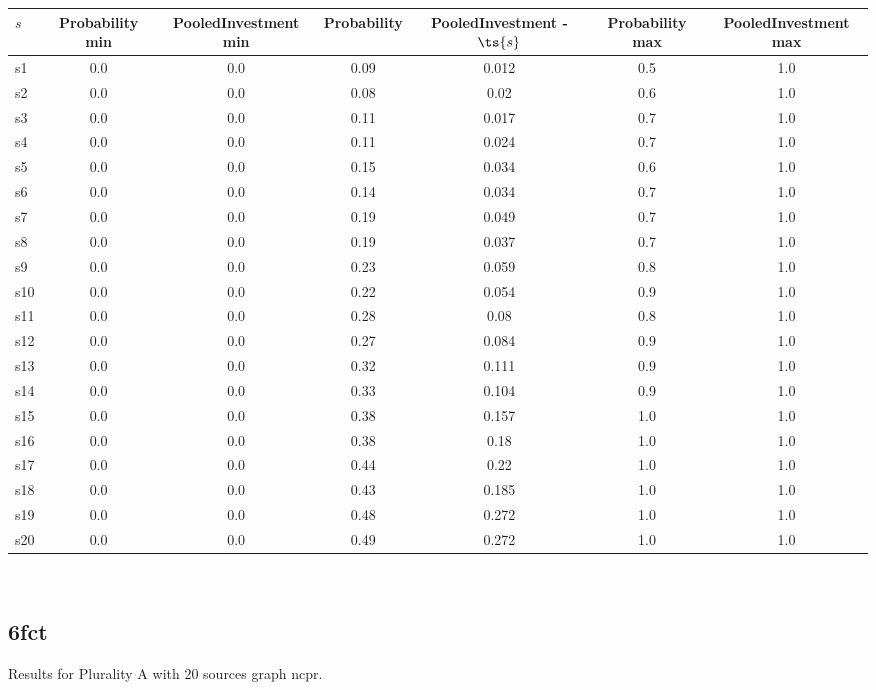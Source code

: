 \documentclass{article}
\begin{document}
\noindent\begin{tabular}{|l|c|c|c|c|c|c|}
\hline
$s$& Probability min & PooledInvestment min & Probability & PooledInvestment - $\ts{s}$ & Probability max & PooledInvestment max\\
\hline
s1 &0.0 & 0.0 & 0.09 & 0.012 & 0.5 & 1.0\\
\hline
s2 &0.0 & 0.0 & 0.08 & 0.02 & 0.6 & 1.0\\
\hline
s3 &0.0 & 0.0 & 0.11 & 0.017 & 0.7 & 1.0\\
\hline
s4 &0.0 & 0.0 & 0.11 & 0.024 & 0.7 & 1.0\\
\hline
s5 &0.0 & 0.0 & 0.15 & 0.034 & 0.6 & 1.0\\
\hline
s6 &0.0 & 0.0 & 0.14 & 0.034 & 0.7 & 1.0\\
\hline
s7 &0.0 & 0.0 & 0.19 & 0.049 & 0.7 & 1.0\\
\hline
s8 &0.0 & 0.0 & 0.19 & 0.037 & 0.7 & 1.0\\
\hline
s9 &0.0 & 0.0 & 0.23 & 0.059 & 0.8 & 1.0\\
\hline
s10 &0.0 & 0.0 & 0.22 & 0.054 & 0.9 & 1.0\\
\hline
s11 &0.0 & 0.0 & 0.28 & 0.08 & 0.8 & 1.0\\
\hline
s12 &0.0 & 0.0 & 0.27 & 0.084 & 0.9 & 1.0\\
\hline
s13 &0.0 & 0.0 & 0.32 & 0.111 & 0.9 & 1.0\\
\hline
s14 &0.0 & 0.0 & 0.33 & 0.104 & 0.9 & 1.0\\
\hline
s15 &0.0 & 0.0 & 0.38 & 0.157 & 1.0 & 1.0\\
\hline
s16 &0.0 & 0.0 & 0.38 & 0.18 & 1.0 & 1.0\\
\hline
s17 &0.0 & 0.0 & 0.44 & 0.22 & 1.0 & 1.0\\
\hline
s18 &0.0 & 0.0 & 0.43 & 0.185 & 1.0 & 1.0\\
\hline
s19 &0.0 & 0.0 & 0.48 & 0.272 & 1.0 & 1.0\\
\hline
s20 &0.0 & 0.0 & 0.49 & 0.272 & 1.0 & 1.0\\
\hline
\end{tabular}\\

\newpage

\subsection{6fct}

\noindent Results for Plurality A with 20 sources graph ncpr.
\end{document}
